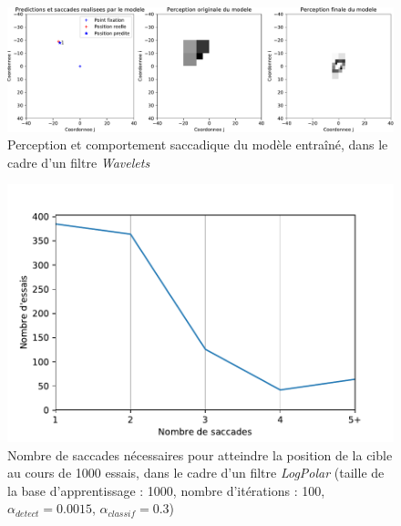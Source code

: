 \begin{figure}[th]
\centering
\includegraphics[scale=0.5]{Figures/saccades}
\decoRule %
\caption[Figure]{Perception et comportement saccadique du modèle entraîné, dans le cadre d'un filtre \textit{Wavelets}}
\label{fig:saccades}
\end{figure}

\begin{figure}[th]
\centering
\includegraphics{Figures/sacc_nombre}
\decoRule %
\caption[Figure]{Nombre de saccades nécessaires pour atteindre la position de la cible au cours de 1000 essais, dans le cadre d'un filtre \textit{LogPolar} (taille de la base d'apprentissage :  1000, nombre d'itérations : 100, $\alpha_{detect}=0.0015$, $\alpha_{classif}=0.3$)}
\label{fig:sacc_nombre}
\end{figure}

